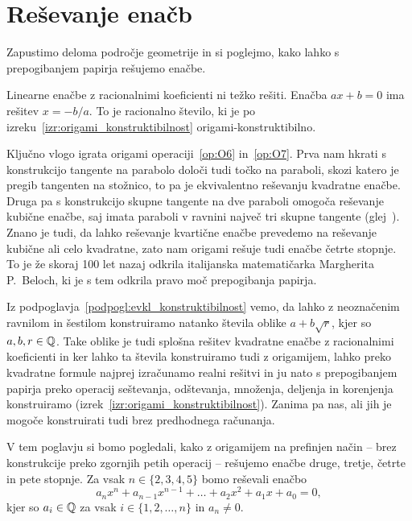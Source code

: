 \section{Reševanje enačb}
\label{pogl:enacbe}



Zapustimo deloma področje geometrije in si poglejmo, kako lahko s prepogibanjem papirja rešujemo enačbe.

Linearne enačbe z racionalnimi koeficienti ni težko rešiti. Enačba $ax + b = 0$ ima rešitev $x = -b/a$. To je racionalno število, ki je po izreku~\ref{izr:origami_konstruktibilnost} origami-konstruktibilno.

Ključno vlogo igrata origami operaciji~\ref{op:O6} in~\ref{op:O7}. Prva nam hkrati s konstrukcijo tangente na parabolo določi tudi točko na paraboli, skozi katero je pregib tangenten na stožnico, to pa je ekvivalentno reševanju kvadratne enačbe. Druga pa s konstrukcijo skupne tangente na dve paraboli omogoča reševanje kubične enačbe, saj imata paraboli v ravnini največ tri skupne tangente (glej~\cite[str.\ 149--150]{geometricconstructions}). Znano je tudi, da lahko reševanje kvartične enačbe prevedemo na reševanje kubične ali celo kvadratne, zato nam origami rešuje tudi enačbe četrte stopnje. To je že skoraj 100 let nazaj odkrila italijanska matematičarka Margherita P.\ Beloch, ki je s tem odkrila pravo moč prepogibanja papirja.

Iz podpoglavja~\ref{podpogl:evkl_konstruktibilnost} vemo, da lahko z neoznačenim ravnilom in šestilom konstruiramo natanko števila oblike $a + b\sqrt{r}$, kjer so $a, b, r \in \mathbb Q$. Take oblike je tudi splošna rešitev kvadratne enačbe z racionalnimi koeficienti in ker lahko ta števila konstruiramo tudi z origamijem, lahko preko kvadratne formule najprej izračunamo realni rešitvi in ju nato s prepogibanjem papirja preko operacij seštevanja, odštevanja, množenja, deljenja in korenjenja konstruiramo (izrek~\ref{izr:origami_konstruktibilnost}). Zanima pa nas, ali jih je mogoče konstruirati tudi brez predhodnega računanja.

V tem poglavju si bomo pogledali, kako z origamijem na prefinjen način -- brez konstrukcije preko zgornjih petih operacij -- rešujemo enačbe druge, tretje, četrte in pete stopnje. Za vsak $n \in \{2, 3, 4, 5\}$ bomo reševali enačbo
$$ a_n x^n + a_{n-1} x^{n-1} + \ldots + a_2 x^2 + a_1 x + a_0 = 0, $$
kjer so $a_i \in \mathbb Q$ za vsak $i \in \{1, 2, \ldots, n\}$ in $a_n \ne 0$.

